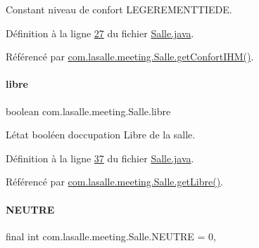Constant niveau de confort L\+E\+G\+E\+R\+E\+M\+E\+N\+T\+T\+I\+E\+DE. 



Définition à la ligne \hyperlink{_salle_8java_source_l00027}{27} du fichier \hyperlink{_salle_8java_source}{Salle.\+java}.



Référencé par \hyperlink{_salle_8java_source_l00233}{com.\+lasalle.\+meeting.\+Salle.\+get\+Confort\+I\+H\+M()}.

\mbox{\label{classcom_1_1lasalle_1_1meeting_1_1_salle_a2965cb92b06dcdd28a07fa550259b1c1}} 
\paragraph{\texorpdfstring{libre}{libre}}
{\footnotesize\ttfamily boolean com.\+lasalle.\+meeting.\+Salle.\+libre\hspace{0.3cm}{\ttfamily [private]}}



L\textquotesingle{}état booléen d\textquotesingle{}occupation Libre de la salle. 



Définition à la ligne \hyperlink{_salle_8java_source_l00037}{37} du fichier \hyperlink{_salle_8java_source}{Salle.\+java}.



Référencé par \hyperlink{_salle_8java_source_l00174}{com.\+lasalle.\+meeting.\+Salle.\+get\+Libre()}.

\mbox{\label{classcom_1_1lasalle_1_1meeting_1_1_salle_aeffa1f0543757746e8376ff8495fcedd}} 
\paragraph{\texorpdfstring{N\+E\+U\+T\+RE}{NEUTRE}}
{\footnotesize\ttfamily final int com.\+lasalle.\+meeting.\+Salle.\+N\+E\+U\+T\+RE = 0\hspace{0.3cm}{\ttfamily [static]}, {\ttfamily [private]}}



